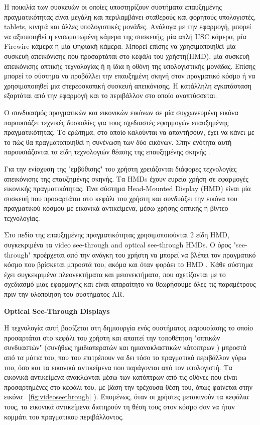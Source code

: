 Η ποικιλία των συσκευών οι οποίες υποστηρίζουν συστήματα επαυξημένης πραγματικότητας είναι μεγάλη και περιλαμβάνει σταθερούς και φορητούς υπολογιστές, tablets, κινητά και άλλες υπολογιστικές μονάδες. Ανάλογα με την εφαρμογή, μπορεί να αξιοποιηθεί η ενσωματωμένη κάμερα της συσκευής, μία απλή USC κάμερα, μία Firewire κάμερα ή μία ψηφιακή κάμερα. Μπορεί επίσης να χρησιμοποιηθεί μία συσκευή απεικόνισης που προσαρτάται στο κεφάλι του χρήστη(HMD), μία συσκευή απεικόνισης οπτικής τεχνολογίας ή η ίδια η οθόνη της υπολογιστικής μονάδας. Επίσης μπορεί το σύστημα να προβάλλει την επαυξημένη σκηνή στον πραγματικό κόσμο \cite{jones2013illumiroom} ή να χρησιμοποιηθεί μια στερεοσκοπική συσκευή απεικόνισης. Η κατάλληλη εγκατάσταση εξαρτάται από την εφαρμογή και το περιβάλλον στο οποίο αναπτύσσεται.




Ο συνδυασμός πραγματικών και εικονικών εικόνων σε μία συγχωνευμένη εικόνα παρουσιάζει τεχνικές δυσκολίες για τους σχεδιαστές εφαρμογών επαυξημένης πραγματικότητας.  Το ερώτημα, στο οποίο καλούνται να απαντήσουν, έχει να κάνει με το πώς θα πραγματοποιηθεί η συνένωση των δύο εικόνων. Στην ενότητα αυτή παρουσιάζονται τα είδη τεχνολογιών θέασης της επαυξημένης σκηνής \cite{azuma2001} \cite{Vallino1998}.



Για την ενίσχυση της "εμβύθισης" του χρήστη χρειάζονται διάφορες τεχνολογίες απεικόνισης της επαυξημένης σκηνής. Τα HMDs έχουν ευρεία χρήση σε εφαρμογές εικονικής πραγματικότητας. Ένα σύστημα Head-Mounted Display (HMD) είναι μία συσκευή που προσαρτάται στο κεφάλι του χρήστη και συνδυάζει την εικόνα του πραγματικού κόσμου με εικονικά αντικείμενα, μέσω χρήσης οπτικής ή βίντεο τεχνολογίας. 


Στο πεδίο της επαυξημένης πραγματικότητας χρησιμοποιούνται 2 είδη HMD, συγκεκριμένα τα video see-through and optical see-through HMDs. Ο όρος "see-through" προέρχεται από την ανάγκη του χρήστη να μπορεί να βλέπει τον πραγματικό κόσμο που βρίσκεται μπροστά του, ακόμα και όταν φοράει το HMD \cite{barfield2001fundamentals}. Κάθε σύστημα έχει συγκεκριμένα πλεονεκτήματα και μειονεκτήματα, που σχετίζονται με το σχεδιασμό μιας εφαρμογής και είναι απαραίτητο  να θεωρήσουμε όλες τις παραμέτρους πριν την υλοποίηση του συστήματος AR. 




 
\textbf{Optical See-Through Displays}


Η τεχνολογία αυτή βασίζεται στη δημιουργία ενός συστήματος παρουσίασης το οποίο προσαρτάται στο κεφάλι του χρήστη και απαιτεί την τοποθέτηση "οπτικών συνδυαστών" (συνήθως ημιδιαπερατών και ημιανακλαστικών κάτοπτρων ) μπροστά από τα μάτια του, που του επιτρέπουν να δει τόσο το πραγματικό περιβάλλον γύρω του, όσο και τα εικονικά αντικείμενα που παράγονται από τον υπολογιστή. 
Τα εικονικά αντικείμενα ανακλώνται μέσω των κατόπτρων από τις οθόνες που είναι προσαρτημένες στο κεφάλι του, με βάση την τρέχουσα θέση του, όπως φαίνεται στην εικόνα ~\ref{fig:videoseethrough} ).  Επομένως, όταν οι χρήστες μετακινούν τα κεφάλια τους, τα εικονικά αντικείμενα διατηρούν τη θέση τους στον κόσμο σαν να ήταν κομμάτι του πραγματικου περιβάλλοντος.



